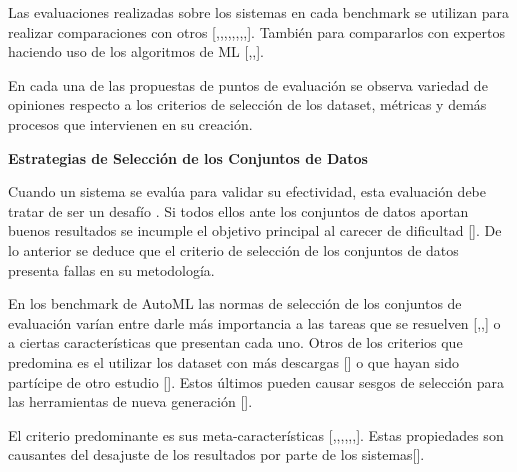 Las evaluaciones realizadas sobre los sistemas en cada benchmark se utilizan para realizar comparaciones con otros
[\cite{10},\cite{14},\cite{15},\cite{17},\cite{18},\cite{23},\cite{24},\cite{31},\cite{32}]. También para compararlos con expertos haciendo uso de los algoritmos de ML 
[\cite{19},\cite{20},\cite{21}].

En cada una de las propuestas de puntos de evaluación se observa variedad de opiniones respecto a los criterios de selección de los dataset, métricas y demás 
procesos que intervienen en su creación.

\begin{flushleft} 
    {\large { \textbf{Estrategias de Selección de los Conjuntos de Datos}}}\label{subsection:sel_conj_AutoML}
\end{flushleft}


Cuando un sistema se evalúa para validar su efectividad, esta evaluación debe tratar de ser un desafío . Si todos ellos ante los conjuntos de datos aportan buenos 
resultados se incumple el objetivo principal al carecer de dificultad [\cite{15}]. De lo anterior se deduce que el criterio de selección de los conjuntos de datos 
presenta fallas en su metodología.

En los benchmark de AutoML las normas de selección de los conjuntos de evaluación varían entre darle más importancia a las tareas que se resuelven 
[\cite{18},\cite{26},\cite{32}] o a ciertas características que presentan cada uno. Otros de los criterios que predomina es el utilizar los dataset con más 
descargas [\cite{19}] o que hayan sido partícipe de otro estudio [\cite{9}]. Estos últimos pueden causar sesgos de selección para las herramientas de nueva generación 
[\cite{15}].

El criterio predominante es sus meta-características [\cite{10},\cite{11},\cite{15},\cite{16},\cite{17},\cite{27},\cite{28}]. Estas propiedades son causantes del 
desajuste de los resultados por parte de los sistemas[\cite{10}].

